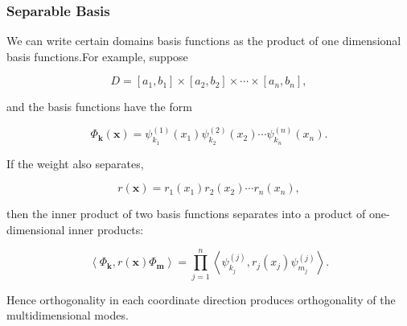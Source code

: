 \subsubsection{Separable Basis}

\begin{remark}
  We can write certain domains basis functions as the product of one dimensional basis functions.For example, suppose

\[
D=\left[a_1, b_1\right] \times\left[a_2, b_2\right] \times \cdots \times\left[a_n, b_n\right],
\]

and the basis functions have the form

\[
\Phi_{\mathbf{k}}(\mathbf{x})=\psi_{k_1}^{(1)}\left(x_1\right) \psi_{k_2}^{(2)}\left(x_2\right) \cdots \psi_{k_n}^{(n)}\left(x_n\right) .
\]

If the weight also separates,

\[
r(\mathbf{x})=r_1\left(x_1\right) r_2\left(x_2\right) \cdots r_n\left(x_n\right),
\]

then the inner product of two basis functions separates into a product of one-dimensional inner products:

\[
\left\langle\Phi_{\mathbf{k}}, r(\mathbf{x}) \Phi_{\mathbf{m}}\right\rangle=\prod_{j=1}^n\left\langle\psi_{k_j}^{(j)}, r_j\left(x_j\right) \psi_{m_j}^{(j)}\right\rangle .
\]

Hence orthogonality in each coordinate direction produces orthogonality of the multidimensional modes.
\end{remark}


